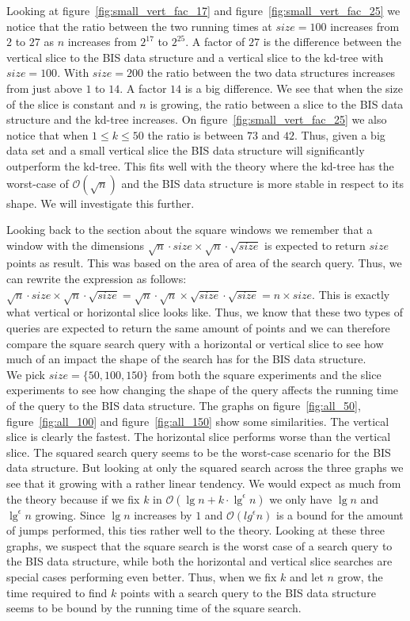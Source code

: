 Looking at figure~\ref{fig:small_vert_fac_17} and figure~\ref{fig:small_vert_fac_25} we notice that the ratio between the two running times at $size = 100$ increases from $2$ to $27$ as $n$ increases from $2^{17}$ to $2^{25}$. A factor of $27$ is the difference between the vertical slice to the BIS data structure and a vertical slice to the kd-tree with $size = 100$. With $size = 200$ the ratio between the two data structures increases from just above $1$ to $14$. A factor $14$ is a big difference. We see that when the size of the slice is constant and $n$ is growing, the ratio between a slice to the BIS data structure and the kd-tree increases. On figure~\ref{fig:small_vert_fac_25} we also notice that when $1 \leq k \leq 50$ the ratio is between $73$ and $42$. Thus, given a big data set and a small vertical slice the BIS data structure will significantly outperform the kd-tree. This fits well with the theory where the kd-tree has the worst-case of $\mathcal{O}(\sqrt{n})$ and the BIS data structure is more stable in respect to its shape. We will investigate this further.

Looking back to the section about the square windows we remember that a window with the dimensions $\sqrt{n}\cdot{size} \times \sqrt{n}\cdot\sqrt{size}$ is expected to return $size$ points as result. This was based on the area of area of the search query. Thus, we can rewrite the expression as follows: $\sqrt{n}\cdot{size} \times \sqrt{n}\cdot\sqrt{size} = \sqrt{n}\cdot\sqrt{n} \times \sqrt{size}\cdot\sqrt{size} = n \times size$. This is exactly what vertical or horizontal slice looks like. Thus, we know that these two types of queries are expected to return the same amount of points and we can therefore compare the square search query with a horizontal or vertical slice to see how much of an impact the shape of the search has for the BIS data structure. \\

We pick $size=\{50,100,150\}$ from both the square experiments and the slice experiments to see how changing the shape of the query affects the running time of the query to the BIS data structure. The graphs on figure~\ref{fig:all_50}, figure~\ref{fig:all_100} and figure~\ref{fig:all_150} show some similarities. The vertical slice is clearly the fastest. The horizontal slice performs worse than the vertical slice. The squared search query seems to be the worst-case scenario for the BIS data structure. But looking at only the squared search across the three graphs we see that it growing with a rather linear tendency. We would expect as much from the theory because if we fix $k$ in $\mathcal{O}(\lg n + k\cdot \lg^\epsilon n)$ we only have $\lg n$ and $\lg^\epsilon n$ growing. Since $\lg n$ increases by $1$ and $\mathcal{O}(lg^\epsilon n)$ is a bound for the amount of jumps performed, this ties rather well to the theory. Looking at these three graphs, we suspect that the square search is the worst case of a search query to the BIS data structure, while both the horizontal and vertical slice searches are special cases performing even better. Thus, when we fix $k$ and let $n$ grow, the time required to find $k$ points with a search query to the BIS data structure seems to be bound by the running time of the square search. 


